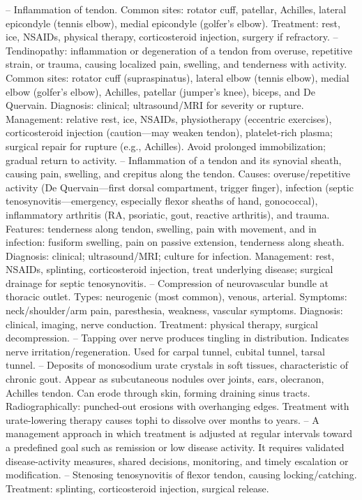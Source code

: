 -- Inflammation of tendon. Common sites: rotator cuff, patellar, Achilles, lateral epicondyle (tennis elbow), medial epicondyle (golfer's elbow). Treatment: rest, ice, NSAIDs, physical therapy, corticosteroid injection, surgery if refractory.
-- Tendinopathy: inflammation or degeneration of a tendon from overuse, repetitive strain, or trauma, causing localized pain, swelling, and tenderness with activity. Common sites: rotator cuff (supraspinatus), lateral elbow (tennis elbow), medial elbow (golfer's elbow), Achilles, patellar (jumper's knee), biceps, and De Quervain. Diagnosis: clinical; ultrasound/MRI for severity or rupture. Management: relative rest, ice, NSAIDs, physiotherapy (eccentric exercises), corticosteroid injection (caution—may weaken tendon), platelet-rich plasma; surgical repair for rupture (e.g., Achilles). Avoid prolonged immobilization; gradual return to activity.
-- Inflammation of a tendon and its synovial sheath, causing pain, swelling, and crepitus along the tendon. Causes: overuse/repetitive activity (De Quervain—first dorsal compartment, trigger finger), infection (septic tenosynovitis—emergency, especially flexor sheaths of hand, gonococcal), inflammatory arthritis (RA, psoriatic, gout, reactive arthritis), and trauma. Features: tenderness along tendon, swelling, pain with movement, and in infection: fusiform swelling, pain on passive extension, tenderness along sheath. Diagnosis: clinical; ultrasound/MRI; culture for infection. Management: rest, NSAIDs, splinting, corticosteroid injection, treat underlying disease; surgical drainage for septic tenosynovitis.
-- Compression of neurovascular bundle at thoracic outlet. Types: neurogenic (most common), venous, arterial. Symptoms: neck/shoulder/arm pain, paresthesia, weakness, vascular symptoms. Diagnosis: clinical, imaging, nerve conduction. Treatment: physical therapy, surgical decompression.
-- Tapping over nerve produces tingling in distribution. Indicates nerve irritation/regeneration. Used for carpal tunnel, cubital tunnel, tarsal tunnel.
-- Deposits of monosodium urate crystals in soft tissues, characteristic of chronic gout. Appear as subcutaneous nodules over joints, ears, olecranon, Achilles tendon. Can erode through skin, forming draining sinus tracts. Radiographically: punched-out erosions with overhanging edges. Treatment with urate-lowering therapy causes tophi to dissolve over months to years.
-- A management approach in which treatment is adjusted at regular intervals toward a predefined goal such as remission or low disease activity. It requires validated disease-activity measures, shared decisions, monitoring, and timely escalation or modification.
-- Stenosing tenosynovitis of flexor tendon, causing locking/catching. Treatment: splinting, corticosteroid injection, surgical release.

